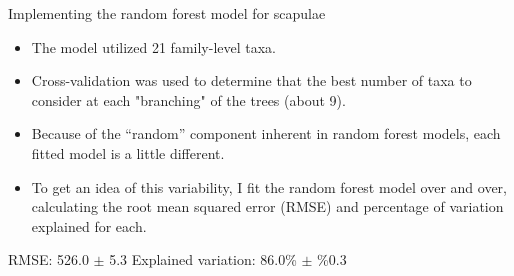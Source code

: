 \documentclass{beamer}
\begin{document}
\begin{frame}{Implementing the random forest model for scapulae}

  \begin{itemize}
  \item The model utilized 21 family-level taxa.
  \item Cross-validation was used to determine that the best number of
    taxa to consider at each "branching" of the trees (about 9).
  \end{itemize}

  \vspace{0.1in}

  \begin{itemize}
  \item Because of the ``random'' component inherent in random forest
    models, each fitted model is a little different.
  \item To get an idea of this variability, I fit the random forest
    model over and over, calculating the root mean squared error
    (RMSE) and percentage of variation explained for each.
  \end{itemize}

  \vspace{0.1in}
  
  \noindent RMSE: 526.0  $\pm$ 5.3 \hspace{0.2in}  Explained variation: 86.0\% $\pm$ \%0.3

\end{frame}
\end{document}
